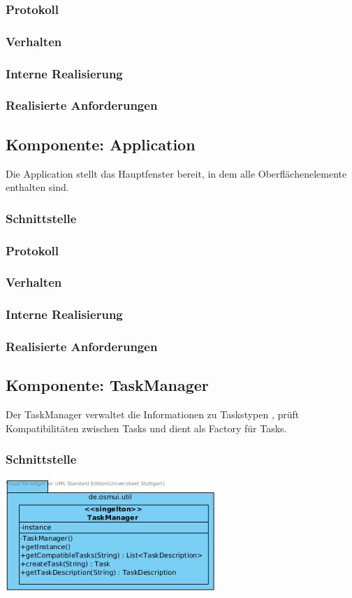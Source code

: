 \documentclass[a4paper,12pt]{scrartcl}
\begin{document}
\subsubsection{Protokoll}
\subsubsection{Verhalten}
\subsubsection{Interne Realisierung}
\subsubsection{Realisierte Anforderungen}

\subsection{Komponente: Application}
Die Application stellt das Hauptfenster bereit, in dem alle Oberflächenelemente enthalten sind.
\subsubsection{Schnittstelle}
\subsubsection{Protokoll}
\subsubsection{Verhalten}
\subsubsection{Interne Realisierung}
\subsubsection{Realisierte Anforderungen}

\subsection{Komponente: TaskManager}
Der TaskManager verwaltet die Informationen zu Taskstypen , prüft Kompatibilitäten zwischen Tasks und dient als Factory für Tasks.
\subsubsection{Schnittstelle}
\begin{center}
\includegraphics[width=8cm]{Schnittstelle_TaskManager.png}
\end{center}
\end{document}
